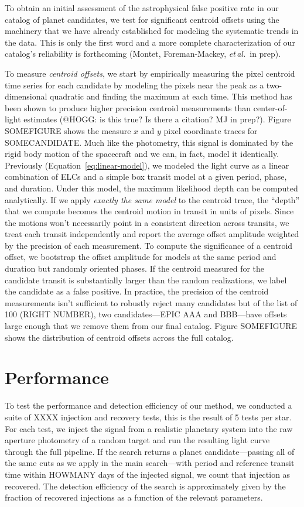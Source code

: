 \documentclass[12pt,preprint]{aastex}
\newcommand{\foreign}[1]{\emph{#1}}
\newcommand{\etal}{\foreign{et\,al.}}
\newcommand{\eqalt}[1]{Equation~\ref{eq:#1}}
\newcommand{\sectlabel}[1]{\label{sect:#1}}
\begin{document}
To obtain an initial assessment of the astrophysical false positive rate in
our catalog of planet candidates, we test for significant centroid offsets
using the machinery that we have already established for modeling the
systematic trends in the data.
This is only the first word and a more complete characterization of our
catalog's reliability is forthcoming (Montet, Foreman-Mackey, \etal\ in prep).

To measure \emph{centroid offsets}, we start by empirically measuring the
pixel centroid time series for each candidate by modeling the pixels near the
peak as a two-dimensional quadratic and finding the maximum at each time.
This method has been shown to produce higher precision centroid measurements
than center-of-light estimates (@HOGG: is this true? Is there a citation? MJ
in prep?).
Figure SOMEFIGURE shows the measure $x$ and $y$ pixel coordinate traces for
SOMECANDIDATE.
Much like the photometry, this signal is dominated by the rigid body motion
of the spacecraft and we can, in fact, model it identically.
Previously (\eqalt{linear-model}), we modeled the light curve as a linear
combination of ELCs and a simple box transit model at a given period, phase,
and duration.
Under this model, the maximum likelihood depth can be computed analytically.
If we apply \emph{exactly the same model} to the centroid trace, the ``depth''
that we compute becomes the centroid motion in transit in units of pixels.
Since the motions won't necessarily point in a consistent direction across
transits, we treat each transit independently and report the average offset
amplitude weighted by the precision of each measurement.
To compute the significance of a centroid offset, we bootstrap the offset
amplitude for models at the same period and duration but randomly oriented
phases.
If the centroid measured for the candidate transit is substantially larger
than the random realizations, we label the candidate as a false positive.
In practice, the precision of the centroid measurements isn't sufficient to
robustly reject many candidates but of the list of 100 (RIGHT NUMBER), two
candidates---EPIC AAA and BBB---have offsets large enough that we remove them
from our final catalog.
Figure SOMEFIGURE shows the distribution of centroid offsets across the full
catalog.


\section{Performance}
\sectlabel{perform}

To test the performance and detection efficiency of our method, we conducted a
suite of XXXX injection and recovery tests, this is the result of 5 tests per
star.
For each test, we inject the signal from a realistic planetary system into the
raw aperture photometry of a random target and run the resulting light curve
through the full pipeline.
If the search returns a planet candidate---passing all of the same cuts as we
apply in the main search---with period and reference transit time within
HOWMANY days of the injected signal, we count that injection as recovered.
The detection efficiency of the search is approximately given by the fraction
of recovered injections as a function of the relevant parameters.
\end{document}
